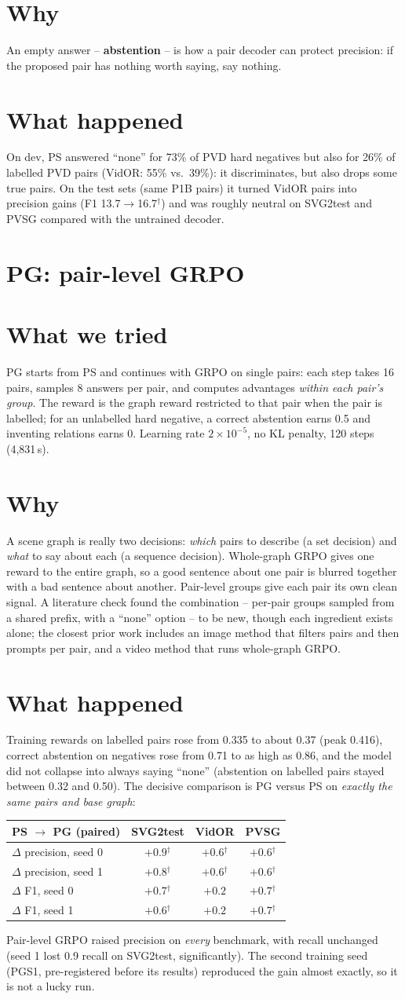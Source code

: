 \documentclass[11pt,openany]{book}
\newcommand{\sig}{\ensuremath{^\dagger}}
\newcommand{\tsec}{\section*{What we tried}}
\newcommand{\wsec}{\section*{Why}}
\newcommand{\hsec}{\section*{What happened}}
\begin{document}
\wsec
An empty answer -- \textbf{abstention} -- is how a pair decoder can protect precision: if the proposed pair has nothing worth
saying, say nothing.

\hsec
On dev, PS answered ``none'' for 73\% of PVD hard negatives but also for 26\% of labelled PVD pairs (VidOR: 55\% vs.\ 39\%): it
discriminates, but also drops some true pairs. On the test sets (same P1B pairs) it turned VidOR pairs into precision gains (F1
13.7$\to$16.7\sig) and was roughly neutral on SVG2test and PVSG compared with the untrained decoder.

\section{PG: pair-level GRPO}
\tsec
PG starts from PS and continues with GRPO on single pairs: each step takes 16 pairs, samples 8 answers per pair, and computes
advantages \emph{within each pair's group}. The reward is the graph reward restricted to that pair when the pair is labelled; for
an unlabelled hard negative, a correct abstention earns 0.5 and inventing relations earns 0. Learning rate $2\times10^{-5}$, no KL
penalty, 120 steps (4,831\,s).

\wsec
A scene graph is really two decisions: \emph{which} pairs to describe (a set decision) and \emph{what} to say about each (a
sequence decision). Whole-graph GRPO gives one reward to the entire graph, so a good sentence about one pair is blurred together
with a bad sentence about another. Pair-level groups give each pair its own clean signal. A literature check found the
combination -- per-pair groups sampled from a shared prefix, with a ``none'' option -- to be new, though each ingredient exists
alone; the closest prior work includes an image method that filters pairs and then prompts per pair, and a video method that runs
whole-graph GRPO.

\hsec
Training rewards on labelled pairs rose from 0.335 to about 0.37 (peak 0.416), correct abstention on negatives rose from 0.71 to as
high as 0.86, and the model did not collapse into always saying ``none'' (abstention on labelled pairs stayed between 0.32 and
0.50). The decisive comparison is PG versus PS on \emph{exactly the same pairs and base graph}:
\begin{center}
\begin{tabular}{@{}lccc@{}}
\toprule
PS $\to$ PG (paired) & SVG2test & VidOR & PVSG \\
\midrule
$\Delta$ precision, seed 0 & $+0.9$\sig & $+0.6$\sig & $+0.6$\sig \\
$\Delta$ precision, seed 1 & $+0.8$\sig & $+0.6$\sig & $+0.6$\sig \\
$\Delta$ F1, seed 0 & $+0.7$\sig & $+0.2$ & $+0.7$\sig \\
$\Delta$ F1, seed 1 & $+0.6$\sig & $+0.2$ & $+0.7$\sig \\
\bottomrule
\end{tabular}
\end{center}
Pair-level GRPO raised precision on \emph{every} benchmark, with recall unchanged (seed 1 lost 0.9 recall on SVG2test,
significantly). The second training seed (PGS1, pre-registered before its results) reproduced the gain almost exactly, so it is
not a lucky run.
\end{document}
